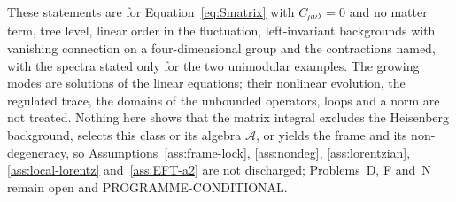 These statements are for Equation~\eqref{eq:Smatrix} with \(C_{\mu\nu\lambda}=0\) and no matter term, tree level, linear order in the fluctuation, left-invariant backgrounds with vanishing connection on a four-dimensional group and the contractions named, with the spectra stated only for the two unimodular examples. The growing modes are solutions of the linear equations; their nonlinear evolution, the regulated trace, the domains of the unbounded operators, loops and a norm are not treated. Nothing here shows that the matrix integral excludes the Heisenberg background, selects this class or its algebra \(\mathcal A\), or yields the frame and its non-degeneracy, so Assumptions~\ref{ass:frame-lock}, \ref{ass:nondeg}, \ref{ass:lorentzian}, \ref{ass:local-lorentz} and~\ref{ass:EFT-a2} are not discharged; Problems~D, F and~N remain open and PROGRAMME-CONDITIONAL.
